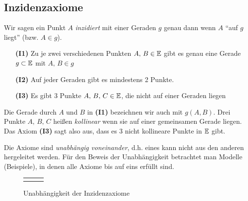 
\subsection*{Inzidenzaxiome}

Wir sagen ein Punkt $A$ {\em inzidiert} mit einer Geraden $g$ genau dann wenn $A$ "`auf $g$ liegt"'
(bzw. $A\in g$).

\begin{itemize}
    \item[{\bf (I1)}] Zu je zwei verschiedenen Punkten $A,\,B\in\mathbb E$ gibt es genau eine Gerade
        $g\subset\mathbb E$ mit $A,\,B\in g$

    \item[{\bf (I2)}] Auf jeder Geraden gibt es mindestens 2 Punkte.

    \item[{\bf (I3)}] Es gibt 3 Punkte $A,\,B,\,C\in\mathbb E$, die nicht auf einer Geraden liegen
\end{itemize}

Die Gerade durch $A$ und $B$ in {\bf(I1)} bezeichnen wir auch mit $g(A,B)$. Drei Punkte $A,\,B,\,C$
heißen \emph{kollinear} wenn sie auf einer gemeinsamen Gerade liegen.  Das Axiom {\bf(I3)} sagt also
aus, dass es 3 nicht kollineare Punkte in $\mathbb E$ gibt.

Die Axiome sind {\em unabhängig voneinander}, d.h. eines kann nicht aus den anderen hergeleitet
werden. Für den Beweis der Unabhängigkeit betrachtet man Modelle (Beispiele), in denen alle Axiome
bis auf eins erfüllt sind.

\begin{center}

    \begin{figure}[ht]
        \begin{tabular}{ccc}
        
        &
        
        &
        
        \end{tabular}
        \caption{Unabhängigkeit der Inzidenzaxiome}
    \end{figure}
\end{center}

